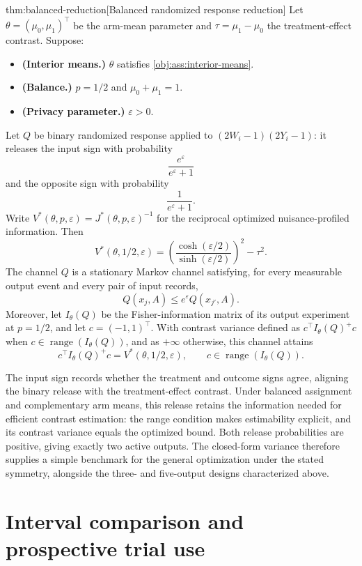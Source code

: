 \documentclass[11pt]{article}
\begin{document}
\begin{theoremv}{thm:balanced-reduction}[Balanced randomized response reduction]
Let \(\theta=(\mu_0,\mu_1)^\top\) be the arm-mean parameter and \(\tau=\mu_1-\mu_0\) the treatment-effect contrast. Suppose:
\begin{itemize}
\item \textbf{(Interior means.)} \(\theta\) satisfies \cref{obj:ass:interior-means}.
\item \textbf{(Balance.)} \(p=1/2\) and \(\mu_0+\mu_1=1\).
\item \textbf{(Privacy parameter.)} \(\varepsilon>0\).
\end{itemize}
Let \(Q\) be binary randomized response applied to \((2W_i-1)(2Y_i-1)\): it releases the input sign with probability
\[
\frac{e^\varepsilon}{e^\varepsilon+1}
\]
and the opposite sign with probability
\[
\frac{1}{e^\varepsilon+1}.
\]
Write \(V^*(\theta,p,\varepsilon)=J^*(\theta,p,\varepsilon)^{-1}\) for the reciprocal optimized nuisance-profiled information. Then
\[
V^*(\theta,1/2,\varepsilon)
=
\left(\frac{\cosh(\varepsilon/2)}{\sinh(\varepsilon/2)}\right)^2-\tau^2.
\]
The channel \(Q\) is a stationary Markov channel satisfying, for every measurable output event and every pair of input records,
\[
Q(x_j,A)\le e^\varepsilon Q(x_{j'},A).
\]
Moreover, let \(I_\theta(Q)\) be the Fisher-information matrix of its output experiment at \(p=1/2\), and let \(c=(-1,1)^\top\). With contrast variance defined as \(c^\top I_\theta(Q)^+c\) when \(c\in\operatorname{range}(I_\theta(Q))\), and as \(+\infty\) otherwise, this channel attains
\[
c^\top I_\theta(Q)^+c=V^*(\theta,1/2,\varepsilon),
\qquad
c\in\operatorname{range}(I_\theta(Q)).
\]
\end{theoremv}

The input sign records whether the treatment and outcome signs agree, aligning the binary release with the treatment-effect contrast. Under balanced assignment and complementary arm means, this release retains the information needed for efficient contrast estimation: the range condition makes estimability explicit, and its contrast variance equals the optimized bound. Both release probabilities are positive, giving exactly two active outputs. The closed-form variance therefore supplies a simple benchmark for the general optimization under the stated symmetry, alongside the three- and five-output designs characterized above.


\section{Interval comparison and prospective trial use}
\end{document}
